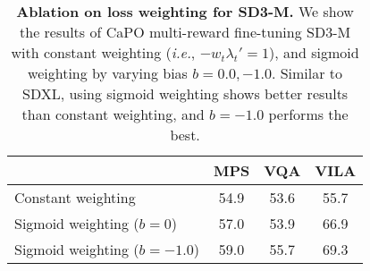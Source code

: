 \begin{table}[t]
\centering
\small
\centering\small
\begin{tabular}{l  ccc}
\toprule
 & MPS & VQA & VILA \\
\midrule
Constant weighting  & 54.9  & 53.6 & 55.7  \\
\midrule
Sigmoid weighting ($b=0$)  & 57.0 & 53.9 & 66.9   \\
Sigmoid weighting ($b=-1.0$)  & 59.0 & 55.7 & 69.3   \\
\bottomrule
\end{tabular}
\caption{
\textbf{Ablation on loss weighting for SD3-M.} We show the results of CaPO multi-reward fine-tuning SD3-M with constant weighting (\emph{i.e.}, $-w_t\lambda_t'=1$), and sigmoid weighting by varying bias $b=0.0, -1.0$. Similar to SDXL, using sigmoid weighting shows better results than constant weighting, and $b=-1.0$ performs the best.
}\label{tab:abl_appendix}
\end{table}